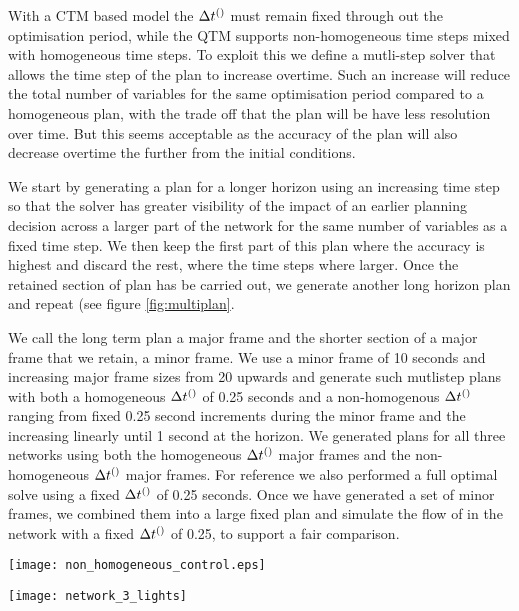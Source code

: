 With a CTM based model the $\DT[]$ must remain fixed through out the
optimisation period, while the QTM supports non-homogeneous time steps
mixed with homogeneous time steps. To exploit this we define a
mutli-step solver that allows the time step of the plan to increase
overtime. Such an increase will reduce the total number of variables
for the same optimisation period compared to a homogeneous plan, with
the trade off that the plan will be have less resolution over
time. But this seems acceptable as the accuracy of the plan will also
decrease overtime the further from the initial conditions.

We start by generating a plan for a longer horizon using an increasing
time step so that the solver has greater visibility of the impact of
an earlier planning decision across a larger part of the network for
the same number of variables as a fixed time step. We then keep the
first part of this plan where the accuracy is highest and discard the
rest, where the time steps where larger. Once the retained section of
plan has be carried out, we generate another long horizon plan and
repeat (see figure \ref{fig:multiplan}.

We call the long term plan a major frame and the shorter section of a
major frame that we retain, a minor frame. We use a minor frame of 10
seconds and increasing major frame sizes from 20 upwards and generate
such mutlistep plans with both a homogeneous $\DT[]$ of 0.25 seconds
and a non-homogenous $\DT[]$ ranging from fixed 0.25 second increments
during the minor frame and the increasing linearly until 1 second at
the horizon. We generated plans for all three networks using both the
homogeneous $\DT[]$ major frames and the non-homogeneous $\DT[]$ major
frames. For reference we also performed a full optimal solve using a
fixed $\DT[]$ of 0.25 seconds. Once we have generated a set of minor
frames, we combined them into a large fixed plan and simulate the flow
of in the network with a fixed $\DT[]$ of 0.25, to support a fair
comparison.

\begin{figure*}[t!]
\centering
\texttt{[image: non\_homogeneous\_control.eps]}
\caption{Multi-step planning}
\label{fig:multiplan}
\end{figure*}


\begin{figure*}[t!]
\centering
\texttt{[image: network\_3\_lights]}
\caption{Network 1}
\label{fig:network3}
\end{figure*}

